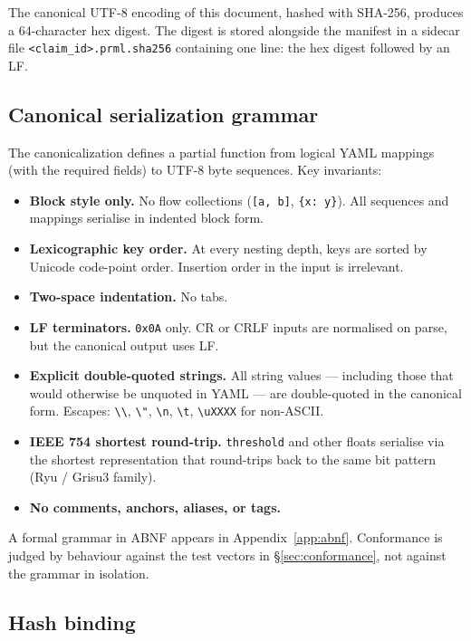 \documentclass[11pt, a4paper]{article}
\begin{document}
The canonical UTF-8 encoding of this document, hashed with SHA-256, produces a 64-character hex digest. The digest is stored alongside the manifest in a sidecar file \texttt{<claim\_id>.prml.sha256} containing one line: the hex digest followed by an LF.

\subsection{Canonical serialization grammar}

The canonicalization defines a partial function from logical YAML mappings (with the required fields) to UTF-8 byte sequences. Key invariants:

\begin{itemize}[leftmargin=2em, itemsep=0.2em]
  \item \textbf{Block style only.} No flow collections (\texttt{[a, b]}, \texttt{\{x: y\}}). All sequences and mappings serialise in indented block form.
  \item \textbf{Lexicographic key order.} At every nesting depth, keys are sorted by Unicode code-point order. Insertion order in the input is irrelevant.
  \item \textbf{Two-space indentation.} No tabs.
  \item \textbf{LF terminators.} \texttt{0x0A} only. CR or CRLF inputs are normalised on parse, but the canonical output uses LF.
  \item \textbf{Explicit double-quoted strings.} All string values --- including those that would otherwise be unquoted in YAML --- are double-quoted in the canonical form. Escapes: \texttt{\textbackslash\textbackslash}, \texttt{\textbackslash"}, \texttt{\textbackslash n}, \texttt{\textbackslash t}, \texttt{\textbackslash uXXXX} for non-ASCII.
  \item \textbf{IEEE 754 shortest round-trip.} \texttt{threshold} and other floats serialise via the shortest representation that round-trips back to the same bit pattern (Ryu / Grisu3 family).
  \item \textbf{No comments, anchors, aliases, or tags.}
\end{itemize}

A formal grammar in ABNF appears in Appendix~\ref{app:abnf}. Conformance is judged by behaviour against the test vectors in \S\ref{sec:conformance}, not against the grammar in isolation.

\subsection{Hash binding}
\end{document}
